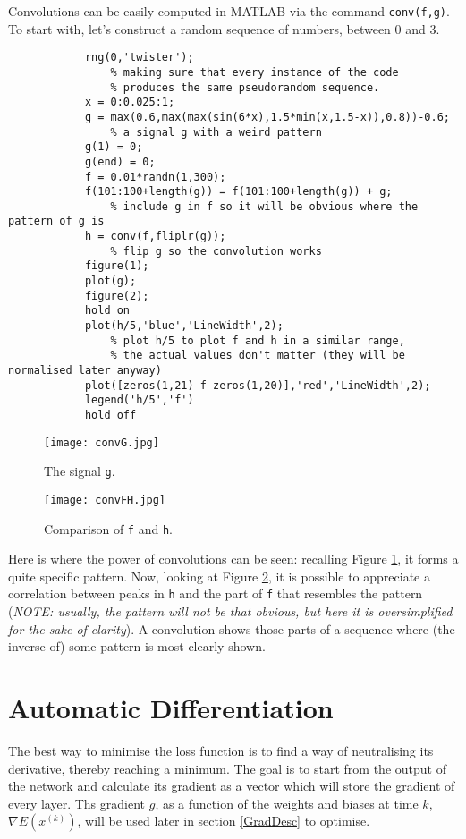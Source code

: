 \documentclass[titlepage]{article}
\theoremstyle{plain}
\theoremstyle{definition}
\begin{document}
		Convolutions can be easily computed in MATLAB via the command \texttt{conv(f,g)}. To start with, let's construct a random sequence of numbers, between 0 and 3.
		\begin{verbatim}
			rng(0,'twister');
				% making sure that every instance of the code 
				% produces the same pseudorandom sequence.
			x = 0:0.025:1;			
			g = max(0.6,max(max(sin(6*x),1.5*min(x,1.5-x)),0.8))-0.6;			
				% a signal g with a weird pattern			
			g(1) = 0;			
			g(end) = 0;			
			f = 0.01*randn(1,300);			
			f(101:100+length(g)) = f(101:100+length(g)) + g;			
				% include g in f so it will be obvious where the pattern of g is			
			h = conv(f,fliplr(g));			
				% flip g so the convolution works	
			figure(1);			
			plot(g);	
			figure(2);			
			hold on		
			plot(h/5,'blue','LineWidth',2);			
				% plot h/5 to plot f and h in a similar range,			
				% the actual values don't matter (they will be normalised later anyway)			
			plot([zeros(1,21) f zeros(1,20)],'red','LineWidth',2);			
			legend('h/5','f')			
			hold off
		\end{verbatim}
		\begin{figure}[H]
			\centering
			\texttt{[image: convG.jpg]}
			\caption{The signal \texttt{g}.}
			\label{fig:seqG}
		\end{figure}
		\begin{figure}[H]
			\centering
			\texttt{[image: convFH.jpg]}
			\caption{Comparison of \texttt{f} and \texttt{h}.}
			\label{fig:seqFH1}
		\end{figure}
		Here is where the power of convolutions can be seen: recalling Figure \ref{fig:seqG}, it forms a quite specific pattern. Now, looking at Figure \ref{fig:seqFH1}, it is possible to appreciate a correlation between peaks in \texttt{h} and the part of \texttt{f} that resembles the pattern (\textit{NOTE: usually, the pattern will not be that obvious, but here it is oversimplified for the sake of clarity}). A convolution shows those parts of a sequence where (the inverse of) some pattern is most clearly shown.
		
	\section{Automatic Differentiation}\label{AutoDiff}
	The best way to minimise the loss function is to find a way of neutralising its derivative, thereby reaching a minimum. The goal is to start from the output of the network and calculate its gradient as a vector which will store the gradient of every layer. Ths gradient $g$, as a function of the weights and biases at time $k$, $\nabla E(x^{(k)})$, will be used later in section \ref{GradDesc} to optimise.
\end{document}
